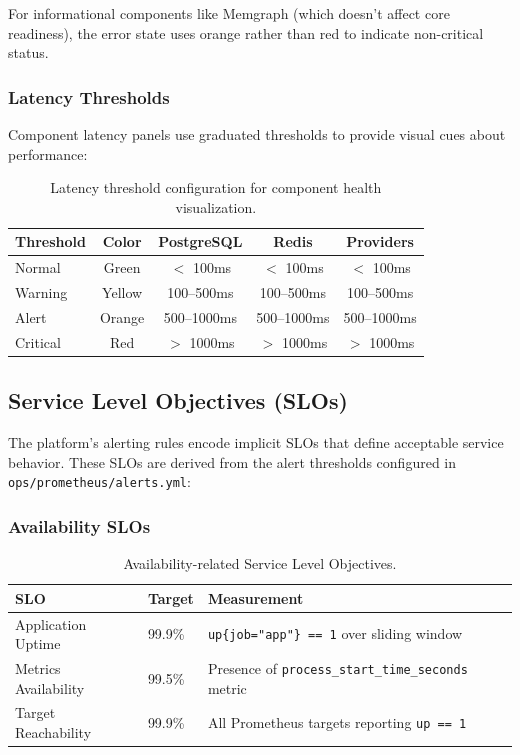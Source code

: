 For informational components like Memgraph (which doesn't affect core readiness), the error state uses orange rather than red to indicate non-critical status.

\subsubsection{Latency Thresholds}

Component latency panels use graduated thresholds to provide visual cues about performance:

\begin{table}[ht]
\centering
\caption{Latency threshold configuration for component health visualization.}
\label{tab:latency-thresholds}
\begin{tabular}{lcccc}
\hline
\textbf{Threshold} & \textbf{Color} & \textbf{PostgreSQL} & \textbf{Redis} & \textbf{Providers} \\
\hline
Normal & Green & $<$ 100ms & $<$ 100ms & $<$ 100ms \\
Warning & Yellow & 100--500ms & 100--500ms & 100--500ms \\
Alert & Orange & 500--1000ms & 500--1000ms & 500--1000ms \\
Critical & Red & $>$ 1000ms & $>$ 1000ms & $>$ 1000ms \\
\hline
\end{tabular}
\end{table}

\subsection{Service Level Objectives (SLOs)}

The platform's alerting rules encode implicit SLOs that define acceptable service behavior. These SLOs are derived from the alert thresholds configured in \texttt{ops/prometheus/alerts.yml}:

\subsubsection{Availability SLOs}

\begin{table}[ht]
\centering
\caption{Availability-related Service Level Objectives.}
\label{tab:availability-slos}
\begin{tabular}{llp{6cm}}
\hline
\textbf{SLO} & \textbf{Target} & \textbf{Measurement} \\
\hline
Application Uptime & 99.9\% & \texttt{up\{job="app"\} == 1} over sliding window \\
Metrics Availability & 99.5\% & Presence of \texttt{process\_start\_time\_seconds} metric \\
Target Reachability & 99.9\% & All Prometheus targets reporting \texttt{up == 1} \\
\hline
\end{tabular}
\end{table}

